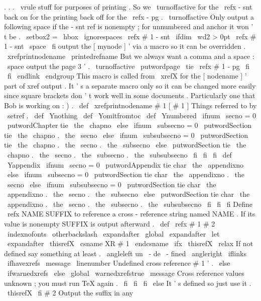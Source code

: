 {{.
.
.
\
vrule
stuff
for
purposes
of
%
printing
.
So
we
\
turnoffactive
for
the
\
refx
-
snt
back
on
for
the
%
printing
back
off
for
the
\
refx
-
pg
.
{
\
turnoffactive
%
Only
output
a
following
space
if
the
-
snt
ref
is
nonempty
;
for
%
unnumbered
and
anchor
it
won
'
t
be
.
\
setbox2
=
\
hbox
{
\
ignorespaces
\
refx
{
#
1
-
snt
}
{
}
}
%
\
ifdim
\
wd2
>
0pt
\
refx
{
#
1
-
snt
}
\
space
\
fi
}
%
%
output
the
[
mynode
]
'
via
a
macro
so
it
can
be
overridden
.
\
xrefprintnodename
\
printedrefname
%
%
But
we
always
want
a
comma
and
a
space
:
\
space
%
%
output
the
page
3
'
.
\
turnoffactive
\
putwordpage
\
tie
\
refx
{
#
1
-
pg
}
{
}
%
\
fi
\
fi
\
endlink
\
endgroup
}
%
This
macro
is
called
from
\
xrefX
for
the
[
nodename
]
'
part
of
xref
%
output
.
It
'
s
a
separate
macro
only
so
it
can
be
changed
more
easily
%
since
square
brackets
don
'
t
work
well
in
some
documents
.
Particularly
%
one
that
Bob
is
working
on
:
)
.
%
\
def
\
xrefprintnodename
#
1
{
[
#
1
]
}
%
Things
referred
to
by
\
setref
.
%
\
def
\
Ynothing
{
}
\
def
\
Yomitfromtoc
{
}
\
def
\
Ynumbered
{
%
\
ifnum
\
secno
=
0
\
putwordChapter
tie
\
the
\
chapno
\
else
\
ifnum
\
subsecno
=
0
\
putwordSection
tie
\
the
\
chapno
.
\
the
\
secno
\
else
\
ifnum
\
subsubsecno
=
0
\
putwordSection
tie
\
the
\
chapno
.
\
the
\
secno
.
\
the
\
subsecno
\
else
\
putwordSection
tie
\
the
\
chapno
.
\
the
\
secno
.
\
the
\
subsecno
.
\
the
\
subsubsecno
\
fi
\
fi
\
fi
}
\
def
\
Yappendix
{
%
\
ifnum
\
secno
=
0
\
putwordAppendix
tie
char
\
the
\
appendixno
{
}
%
\
else
\
ifnum
\
subsecno
=
0
\
putwordSection
tie
char
\
the
\
appendixno
.
\
the
\
secno
\
else
\
ifnum
\
subsubsecno
=
0
\
putwordSection
tie
char
\
the
\
appendixno
.
\
the
\
secno
.
\
the
\
subsecno
\
else
\
putwordSection
tie
char
\
the
\
appendixno
.
\
the
\
secno
.
\
the
\
subsecno
.
\
the
\
subsubsecno
\
fi
\
fi
\
fi
}
%
Define
\
refx
{
NAME
}
{
SUFFIX
}
to
reference
a
cross
-
reference
string
named
NAME
.
%
If
its
value
is
nonempty
SUFFIX
is
output
afterward
.
%
\
def
\
refx
#
1
#
2
{
%
{
%
\
indexnofonts
\
otherbackslash
\
expandafter
\
global
\
expandafter
\
let
\
expandafter
\
thisrefX
\
csname
XR
#
1
\
endcsname
}
%
\
ifx
\
thisrefX
\
relax
%
If
not
defined
say
something
at
least
.
\
angleleft
un
\
-
de
\
-
fined
\
angleright
\
iflinks
\
ifhavexrefs
\
message
{
\
linenumber
Undefined
cross
reference
#
1
'
.
}
%
\
else
\
ifwarnedxrefs
\
else
\
global
\
warnedxrefstrue
\
message
{
Cross
reference
values
unknown
;
you
must
run
TeX
again
.
}
%
\
fi
\
fi
\
fi
\
else
%
It
'
s
defined
so
just
use
it
.
\
thisrefX
\
fi
#
2
%
Output
the
suffix
in
any
}}
